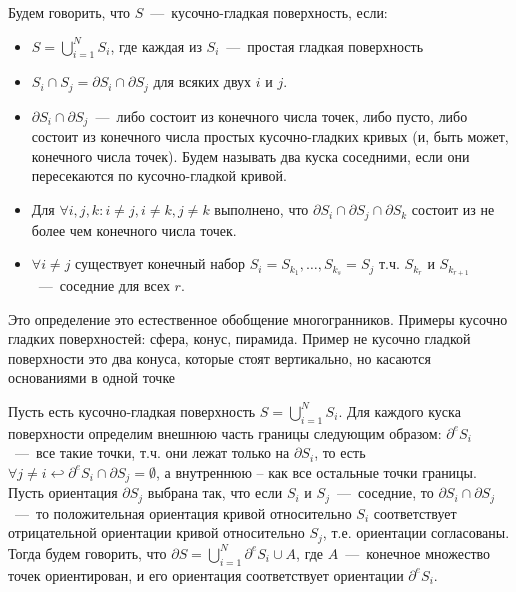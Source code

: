 \begin{definition}
    Будем говорить, что $S$~---~кусочно-гладкая поверхность, если:
    \begin{itemize}
        \item $S = \bigcup\limits_{i = 1}^N S_i$, где каждая из $S_i$~---~простая гладкая поверхность
        \item $S_i \cap S_j = \partial S_i \cap \partial S_j$ для всяких двух $i$ и $j$.
        \item $\partial S_i \cap \partial S_j$~---~либо состоит из конечного числа точек, либо пусто, либо состоит из конечного числа простых кусочно-гладких кривых (и, быть может, конечного числа точек). Будем называть два куска соседними, если они пересекаются по кусочно-гладкой кривой.
        \item Для $\forall i, j, k: i \neq j, i \neq k, j \neq k$ выполнено, что $\partial S_i \cap \partial S_j \cap \partial S_k$  состоит из не более чем конечного числа точек.
        \item $\forall i \neq j$ существует конечный набор $S_i = S_{k_1}, \ldots, S_{k_s} = S_j$ т.ч. $S_{k_r}$ и $S_{k_{r + 1}}$~---~соседние для всех $r$.
    \end{itemize}
\end{definition}
\begin{example}
    Это определение это естественное обобщение многогранников. Примеры кусочно гладких поверхностей: сфера, конус, пирамида. Пример не кусочно гладкой поверхности это два конуса, которые стоят вертикально, но касаются основаниями в одной точке
\end{example}
\begin{definition}
    Пусть есть кусочно-гладкая поверхность $S = \bigcup\limits_{ i = 1}^N S_i$. Для каждого куска поверхности определим внешнюю часть границы следующим образом: $\partial^eS_i$~---~все такие точки, т.ч. они лежат только на $\partial S_i$, то есть $\forall j \neq i \hookleftarrow \partial^e S_i \cap \partial S_j = \emptyset$, а внутреннюю -- как все остальные точки границы. Пусть ориентация $\partial S_j$ выбрана так, что если $S_i$ и $S_j$~---~соседние, то $\partial S_i \cap \partial S_j$~---~то положительная ориентация кривой относительно $S_i$ соответствует отрицательной ориентации кривой относительно $S_j$, т.е. ориентации согласованы.
    Тогда будем говорить, что $\partial S = \bigcup\limits_{i = 1}^N \partial^e S_i \cup A$, где $A$~---~конечное множество точек ориентирован, и его ориентация соответствует ориентации $\partial^eS_i$.
\end{definition}

